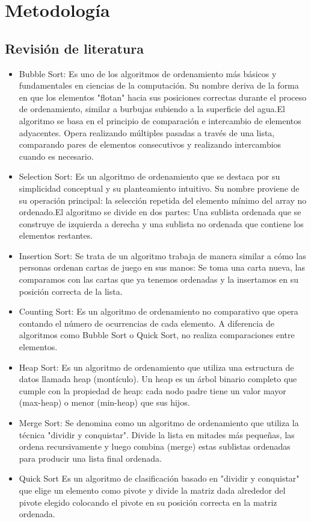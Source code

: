 \newpage






\section{Metodología}

\subsection{Revisión de literatura}

\begin{itemize}
    \item  Bubble Sort:
    Es uno de los algoritmos de ordenamiento más básicos y fundamentales en ciencias de la computación. Su nombre deriva de la forma en que los elementos "flotan" hacia sus posiciones correctas durante el proceso de ordenamiento, similar a burbujas subiendo a la superficie del agua.El algoritmo se basa en el principio de comparación e intercambio de elementos adyacentes. Opera realizando múltiples pasadas a través de una lista, comparando pares de elementos consecutivos y realizando intercambios cuando es necesario.
    \item Selection Sort:
    Es un algoritmo de ordenamiento que se destaca por su simplicidad conceptual y su planteamiento intuitivo. Su nombre proviene de su operación principal: la selección repetida del elemento mínimo del array no ordenado.El algoritmo se divide en dos partes: Una sublista ordenada que se construye de izquierda a derecha y una sublista no ordenada que contiene los elementos restantes.
    \item Insertion Sort:
    Se trata de un algoritmo trabaja de manera similar a cómo las personas ordenan cartas de juego en sus manos: Se toma una carta nueva, las comparamos con las cartas que ya tenemos ordenadas y la insertamos en su posición correcta de la lista.
    \item Counting Sort:
    Es un algoritmo de ordenamiento no comparativo que opera contando el número de ocurrencias de cada elemento. A diferencia de algoritmos como Bubble Sort o Quick Sort, no realiza comparaciones entre elementos.
    \item Heap Sort:
    Es un algoritmo de ordenamiento que utiliza una estructura de datos llamada heap (montículo). Un heap es un árbol binario completo que cumple con la propiedad de heap: cada nodo padre tiene un valor mayor (max-heap) o menor (min-heap) que sus hijos.
    \item Merge Sort:
    Se denomina como un algoritmo de ordenamiento que utiliza la técnica "dividir y conquistar". Divide la lista en mitades más pequeñas, las ordena recursivamente y luego combina (merge) estas sublistas ordenadas para producir una lista final ordenada.
    \item Quick Sort
    Es un algoritmo de clasificación basado en "dividir y conquistar" que elige un elemento como pivote y divide la matriz dada alrededor del pivote elegido colocando el pivote en su posición correcta en la matriz ordenada.

\vspace{2cm}
\end{itemize}

